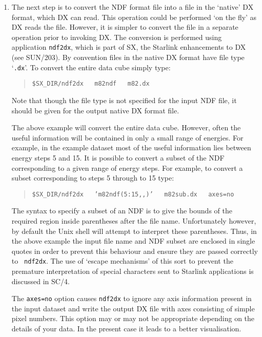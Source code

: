 \documentclass[twoside,11pt]{article}
\newcommand{\xref}[3]{#1}
\begin{document}
\begin{enumerate}
  \item The next step is to convert the NDF format file into a file
   in the `native' DX format, which DX can read.  This operation
   could be performed `on the fly' as DX reads the file.  However, it
   is simpler to convert the file in a separate operation prior to
   invoking DX.  The conversion is performed using application
   \xref{{\tt ndf2dx}}{sun203}{NDF2DX}, which is part of SX, the
   Starlink enhancements to DX (see \xref{SUN/203}{sun203}{}\cite{SUN203}).
   By convention files in the native DX format have file type `{\tt .dx}'.
   To convert the entire data cube simply type:

  \begin{quote}
   {\tt \$SX\_DIR/ndf2dx ~ m82ndf ~ m82.dx}
  \end{quote}

   Note that though the file type is not specified for the input NDF
   file, it should be given for the output native DX format file.

   The above example will convert the entire data cube.  However, often
   the useful information will be contained in only a small range of
   energies.  For example, in the example dataset most of the
   useful information lies between energy steps 5 and 15.  It is
   possible to convert a subset of the NDF corresponding to a given
   range of energy steps.  For example, to convert a subset
   corresponding to steps 5 through to 15 type:

  \begin{quote}
   {\tt \$SX\_DIR/ndf2dx ~ 'm82ndf(5:15,,)' ~ m82sub.dx ~ axes=no}
  \end{quote}

   The syntax to specify a subset of an NDF is to give the bounds of
   the required region inside parentheses after the file name.
   Unfortunately however, by default the Unix shell will attempt to
   interpret these parentheses.  Thus, in the above example the input
   file name and NDF subset are enclosed in single quotes in order to
   prevent this behaviour and ensure they are passed correctly to {\tt
   ndf2dx}.  The use of `escape mechanisms'  of this sort to prevent the
   premature interpretation of special characters sent to Starlink
   applications is discussed in \xref{SC/4}{sc4}{sc4_se_spec_char}\cite{SC4}.

   The {\tt axes=no} option causes {\tt ndf2dx} to ignore any axis
   information present in the input dataset and write the output DX file
   with axes consisting of simple pixel numbers.  This option may or
   may not be appropriate depending on the details of your data.
   In the present case it leads to a better visualisation.


\end{enumerate}
\end{document}
